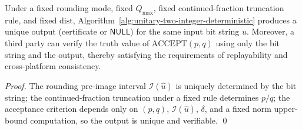 \begin{proposition}\label{prop:unitary-two-integer-reproducible}
Under a fixed rounding mode, fixed \(Q_{\max}\), fixed continued-fraction truncation rule, and fixed \(\mathrm{dist}\), Algorithm~\ref{alg:unitary-two-integer-deterministic} produces a unique output (certificate or \(\mathsf{NULL}\)) for the same input bit string \(\widehat u\).
Moreover, a third party can verify the truth value of \(\mathrm{ACCEPT}(p,q)\) using only the bit string and the output, thereby satisfying the requirements of replayability and cross-platform consistency.
\end{proposition}
\begin{proof}
The rounding pre-image interval \(\mathcal{I}(\widehat u)\) is uniquely determined by the bit string; the continued-fraction truncation under a fixed rule determines \(p/q\); the acceptance criterion depends only on \((p,q)\), \(\mathcal{I}(\widehat u)\), \(\delta\), and a fixed norm upper-bound computation, so the output is unique and verifiable. \qed
\end{proof}
